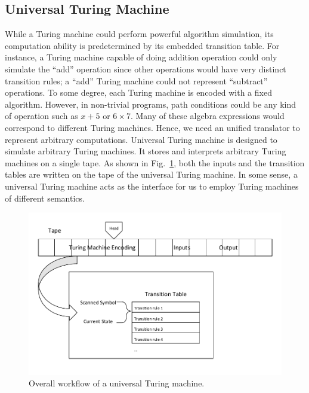 \documentclass[lnicst]{svmultln}
\newcommand{\F}{Fig.}
\begin{document}
\subsection{Universal Turing Machine}
While a Turing machine could perform powerful algorithm simulation, its
computation ability is predetermined by its embedded transition table. For
instance, a Turing machine capable of doing addition operation could only
simulate the ``add'' operation since other operations would have very distinct
transition rules; a ``add'' Turing machine could not represent ``subtract''
operations. To some degree, each Turing machine is encoded with a fixed
algorithm. However, in non-trivial programs, path conditions could be any kind
of operation such as \(x + 5\) or \(6 \times 7 \). Many of these algebra
expressions would correspond to different Turing machines. Hence, we need an
unified translator to represent arbitrary computations. Universal Turing machine
is designed to simulate arbitrary Turing machines. It stores and interprets
arbitrary Turing machines on a single tape. As shown in \F~\ref{fig:four}, both
the inputs and the transition tables are written on the tape of the universal
Turing machine. In some sense, a universal Turing machine acts as the interface
for us to employ Turing machines of different semantics.

\begin{figure}
 \includegraphics[width=\linewidth]{UTM.pdf}
 \caption{Overall workflow of a universal Turing machine.}
 \label{fig:four}
\end{figure}
\end{document}
